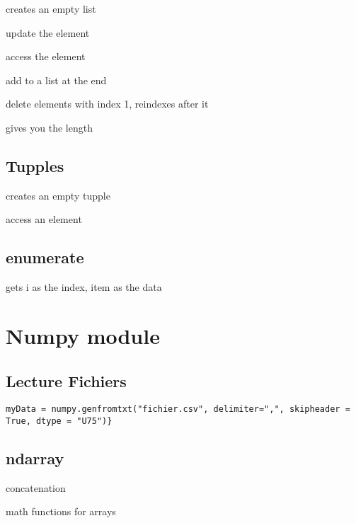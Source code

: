		 creates an empty list


		 update the element

		 access the element

		  add to a list at the end

		 delete elements with index 1, reindexes after it

		 gives you the length

	\subsection{Tupples}
		
		 creates an empty tupple


		 access an element


	\subsection{enumerate}

		 gets i as the index, item as the data

\section{Numpy module}

	\subsection{Lecture Fichiers}
		
\begin{lstlisting}
myData = numpy.genfromtxt("fichier.csv", delimiter=",", skipheader = True, dtype = "U75")}
\end{lstlisting}

	\subsection{ndarray}
		


		 concatenation

		 math functions for arrays

